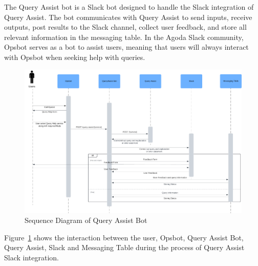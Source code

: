     The Query Assist bot is a Slack bot designed to handle the Slack integration of Query Assist. The bot communicates with Query Assist to send inputs, receive outputs, post results to the Slack channel, collect user feedback, and store all relevant information in the messaging table. In the Agoda Slack community, Opsbot serves as a bot to assist users, meaning that users will always interact with Opsbot when seeking help with queries. 
    \begin{figure}[H]
        \centering
        \includegraphics[width=15cm]{chapters/3/figures/sequence_diagram.png}
        \caption[Sequence Diagram of Query Assist Bot]{Sequence Diagram of Query Assist Bot}
        \label{fig:sequence_diagram}
    \end{figure}
    Figure~\ref{fig:sequence_diagram} shows the interaction between the user, Opsbot, Query Assist Bot, Query Assist, Slack and Messaging Table during the process of Query Assist Slack integration. 

